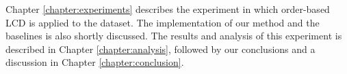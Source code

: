 Chapter \ref{chapter:experiments} describes the experiment in which order-based LCD is applied to the \citet{kemmeren2014large} dataset. The implementation of our method and the baselines is also shortly discussed. The results and analysis of this experiment is described in Chapter \ref{chapter:analysis}, followed by our conclusions and a discussion in Chapter \ref{chapter:conclusion}.




